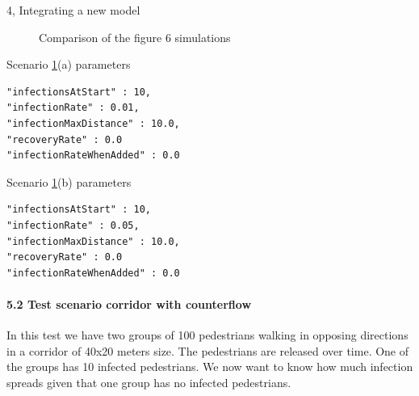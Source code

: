 \begin{task}{4, Integrating a new model}
\begin{figure}[H]
\caption{Comparison of the figure 6 simulations}
\label{fig:fig6sim}
\end{figure}

\noindent Scenario \ref{fig:fig6sim}(a) parameters
\begin{verbatim}
"infectionsAtStart" : 10,
"infectionRate" : 0.01,
"infectionMaxDistance" : 10.0,
"recoveryRate" : 0.0
"infectionRateWhenAdded" : 0.0
\end{verbatim}
Scenario \ref{fig:fig6sim}(b) parameters
\begin{verbatim}
"infectionsAtStart" : 10,
"infectionRate" : 0.05,
"infectionMaxDistance" : 10.0,
"recoveryRate" : 0.0
"infectionRateWhenAdded" : 0.0
\end{verbatim}

\paragraph{5.2 Test scenario corridor with counterflow}

In this test we have two groups of 100 pedestrians walking in opposing directions in a corridor of 40x20 meters size. The pedestrians are released over time. One of the groups has 10 infected pedestrians. We now  want to know how much infection spreads given that one group has no infected pedestrians.


\end{task}
